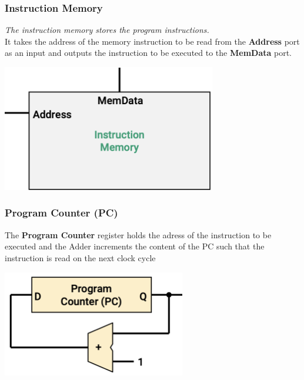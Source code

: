 \documentclass[12pt,openany]{book}
\begin{document}
\subsubsection*{Instruction Memory}
\begin{minipage}
	[htp]{0.55\textwidth}
\textit{The instruction memory stores the program instructions.}\\
\vspace*{10px}
It takes the address of the memory instruction to be read from the \textbf{Address} port as an input and outputs the instruction to be executed to the \textbf{MemData} port.\end{minipage}
\hfill
\vline
\hfill
\begin{minipage}[htp]{0.4\textwidth}
	\begin{center}
		\includegraphics[width=0.7\textwidth]{circuits/19.4.2.png}
	\end{center}
\end{minipage}
\subsubsection*{Program Counter (PC)}
\begin{minipage}[htp]{0.5\textwidth}

\begin{justify}
	The \textbf{Program Counter} register holds the adress of the instruction to be executed and the Adder increments the content of the PC such that the instruction is read on the next clock cycle \\
	
\end{justify}\end{minipage}\hfill
\vline
\hfill
\begin{minipage}[htp]{0.45\textwidth}
	\begin{center}
		\includegraphics[width=0.6\textwidth]{circuits/19.4.2_2.png}
	\end{center}
\end{minipage}
\end{document}
